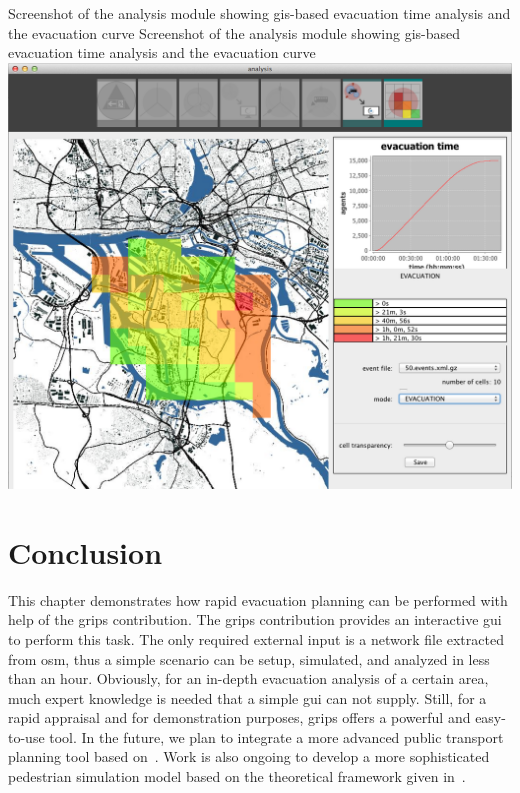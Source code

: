 \createfigure%
{Screenshot of the analysis module showing \protect\gls{gis}-based evacuation time analysis and the evacuation curve}%
{Screenshot of the analysis module showing \protect\gls{gis}-based evacuation time analysis and the evacuation curve}%
{\label{chap:evac:fig:analysis}}%
{\includegraphics[width=1\textwidth]{extending/figures/Evacuation/it50_evac_time}}
{}

\section{Conclusion}
\label{grips:outlook}
This chapter demonstrates how rapid evacuation planning can be performed with help of the \gls{grips} contribution. The \gls{grips} contribution provides an interactive \gls{gui} to perform this task.
The only required external input is a network file extracted from \gls{osm}, thus a simple scenario can be setup, simulated, and analyzed in less than an hour. Obviously, for an in-depth evacuation analysis of a certain area, much expert knowledge is needed that a simple \gls{gui} can not supply. Still, for a rapid appraisal and for demonstration purposes, \gls{grips} offers a powerful and easy-to-use tool. In the future, we plan to integrate a more advanced public transport planning tool based on~\citet{Neumann2014PhD}. Work is also ongoing to develop a more sophisticated pedestrian simulation model based on the theoretical framework given in~\citet{00FloetteroedLaemmel2014BiPedFnd}.

